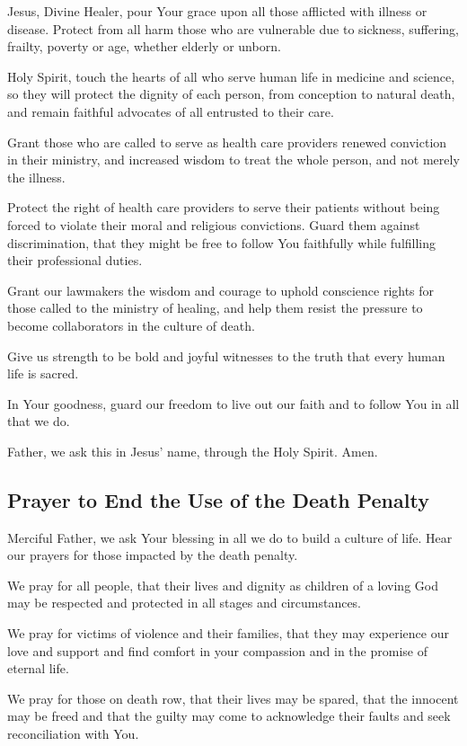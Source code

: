 \documentclass[12pt]{article}
\newcommand{\prayertitle}[1]{\subsection{#1}}
\begin{document}
Jesus, Divine Healer, pour Your grace upon all those afflicted with illness or disease.
Protect from all harm those who are vulnerable due to sickness, suffering, frailty, poverty or age, whether elderly or unborn.

Holy Spirit, touch the hearts of all who serve human life in medicine and science, so they will protect the dignity of each person, from conception to natural death, and remain faithful advocates of all entrusted to their care.  

Grant those who are called to serve as health care providers renewed conviction in their ministry, and increased wisdom to treat the whole person, and not merely the illness.

Protect the right of health care providers to serve their patients without being forced to violate their moral and religious convictions.
Guard them against discrimination, that they might be free to follow You faithfully while fulfilling their professional duties.

Grant our lawmakers the wisdom and courage to uphold conscience rights for those called to the ministry of healing, and help them resist the pressure to become collaborators in the culture of death.

Give us strength to be bold and joyful witnesses to the truth that every human life is sacred.

In Your goodness, guard our freedom to live out our faith and to follow You in all that we do.

Father, we ask this in Jesus’ name, through the Holy Spirit. Amen.

\prayertitle{Prayer to End the Use of the Death Penalty}
Merciful Father, we ask Your blessing in all we do to build a culture of life.
Hear our prayers for those impacted by the death penalty.

We pray for all people, that their lives and dignity as children of a loving God may be respected and protected in all stages and circumstances.

We pray for victims of violence and their families, that they may experience our love and support and find comfort in your compassion and in the promise of eternal life.

We pray for those on death row, that their lives may be spared, that the innocent may be freed and that the guilty may come to acknowledge their faults and seek reconciliation with You.
\end{document}
